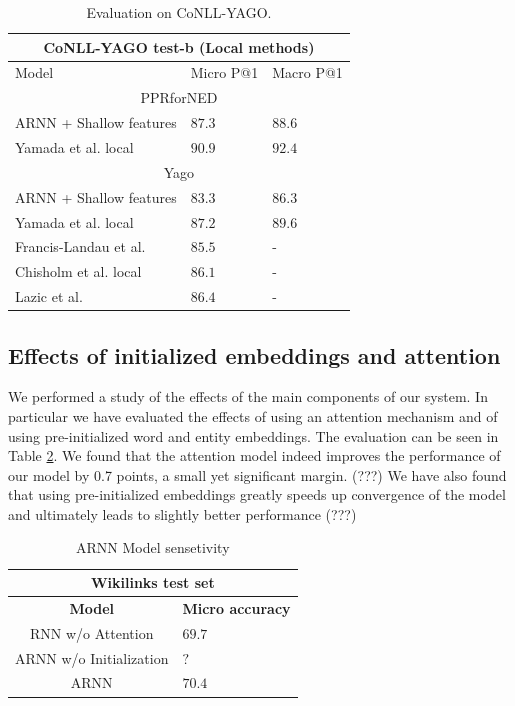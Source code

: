 \documentclass[11pt]{article}
\begin{document}
\begin{table}[h]
	\begin{center}
		\begin{tabular}{|p{3.5cm}| p{1.5cm} p{1.5cm}|}
			\hline \multicolumn{3}{|c|}{CoNLL-YAGO test-b (Local methods)} \\
			\hline Model & Micro P@1 & Macro P@1 \\ 
			\hline \multicolumn{3}{|c|}{PPRforNED} \\
			\hline ARNN + Shallow features    & $87.3$  & $88.6$ \\
			Yamada et al. local               & $90.9$  & $92.4$ \\
			\hline \multicolumn{3}{|c|}{Yago} \\
			\hline ARNN + Shallow features    & $83.3$  & $86.3$ \\
			Yamada et al. local               & $87.2$  & $89.6$ \\
			Francis-Landau et al.             & $85.5$  & - \\
			Chisholm et al. local             & $86.1$  & - \\
			\hline Lazic et al.               & $86.4$  & - \\
			\hline
		\end{tabular}
	\end{center}
	\caption{\label{tab:conll} Evaluation on CoNLL-YAGO.}
\end{table}

\subsection{Effects of initialized embeddings and attention}

We performed a study of the effects of the main components of our system. In particular we have evaluated the effects of using an attention mechanism and of using pre-initialized word and entity embeddings. The evaluation can be seen in Table \ref{tab:c}. We found that the attention model indeed improves the performance of our model by 0.7 points, a small yet significant margin. (???) We have also found that using pre-initialized embeddings greatly speeds up convergence of the model and ultimately leads to slightly better performance (???)

\begin{table}[h]
	\begin{center}
		\begin{tabular}{|c| p{1.5cm}|}
			\hline \multicolumn{2}{|c|}{Wikilinks test set} \\
			\hline \bf Model & \bf Micro     accuracy  \\ \hline
			RNN w/o Attention & $69.7$ \\
			ARNN w/o Initialization & $?$ \\
			ARNN & $70.4$ \\ 
			\hline
		\end{tabular}
	\end{center}
	\caption{\label{tab:c} ARNN Model sensetivity}
\end{table}
\end{document}
